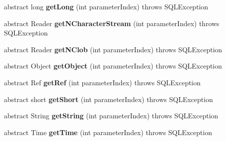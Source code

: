 \begin{DoxyCompactItemize}
abstract long {\bfseries get\+Long} (int parameter\+Index)  throws S\+Q\+L\+Exception
\item 
\mbox{\label{interfacecom_1_1mysql_1_1jdbc_1_1_parameter_bindings_a4453b0d73bfe57c32cb5c39ee4284e08}} 
abstract Reader {\bfseries get\+N\+Character\+Stream} (int parameter\+Index)  throws S\+Q\+L\+Exception
\item 
\mbox{\label{interfacecom_1_1mysql_1_1jdbc_1_1_parameter_bindings_a0477718b6f9544ca1ee1276d2d8e5a51}} 
abstract Reader {\bfseries get\+N\+Clob} (int parameter\+Index)  throws S\+Q\+L\+Exception
\item 
\mbox{\label{interfacecom_1_1mysql_1_1jdbc_1_1_parameter_bindings_a335467f08bda434fdd8e65178c05ce6a}} 
abstract Object {\bfseries get\+Object} (int parameter\+Index)  throws S\+Q\+L\+Exception
\item 
\mbox{\label{interfacecom_1_1mysql_1_1jdbc_1_1_parameter_bindings_a77b303d99e42482d7ca5c77f499d8d6a}} 
abstract Ref {\bfseries get\+Ref} (int parameter\+Index)  throws S\+Q\+L\+Exception
\item 
\mbox{\label{interfacecom_1_1mysql_1_1jdbc_1_1_parameter_bindings_a63af2995ad345620eed7667c529acb42}} 
abstract short {\bfseries get\+Short} (int parameter\+Index)  throws S\+Q\+L\+Exception
\item 
\mbox{\label{interfacecom_1_1mysql_1_1jdbc_1_1_parameter_bindings_ae3dbc2ed0783b91b27813c7639f04690}} 
abstract String {\bfseries get\+String} (int parameter\+Index)  throws S\+Q\+L\+Exception
\item 
\mbox{\label{interfacecom_1_1mysql_1_1jdbc_1_1_parameter_bindings_adbfb40b54cb2f3a591a27bb7fe046b6f}} 
abstract Time {\bfseries get\+Time} (int parameter\+Index)  throws S\+Q\+L\+Exception
\item 
\mbox{\label{interfacecom_1_1mysql_1_1jdbc_1_1_parameter_bindings_a71fb58dc6bbe8da56a49ba667d3a0650}} 

\end{DoxyCompactItemize}
